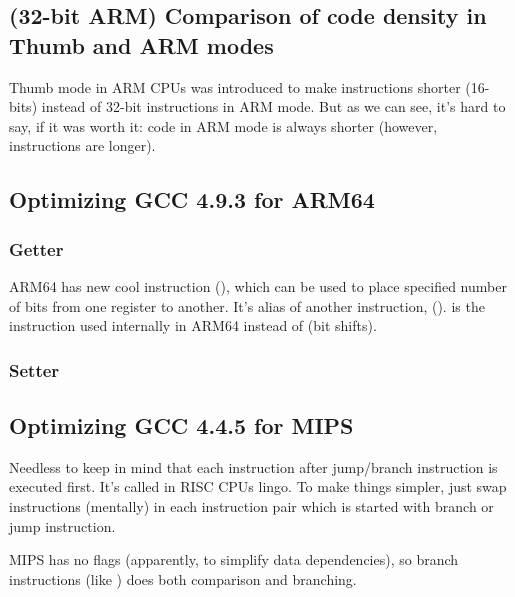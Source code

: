 \subsection{(32-bit ARM) Comparison of code density in Thumb and ARM modes}

Thumb mode in ARM CPUs was introduced to make instructions shorter (16-bits) instead of 32-bit instructions in ARM mode.
But as we can see, it's hard to say, if it was worth it: code in ARM mode is always shorter (however, instructions are longer).

\subsection{Optimizing GCC 4.9.3 for ARM64}

\subsubsection{Getter}



ARM64 has new cool instruction  (), 
which can be used to place specified number of bits from one register to another.
It's alias of another instruction,  ().
 is the instruction used internally in ARM64 instead of  (bit shifts).

\subsubsection{Setter}



\subsection{Optimizing GCC 4.4.5 for MIPS}

Needless to keep in mind that each instruction after jump/branch instruction is executed first.
It's called  in RISC CPUs lingo.
To make things simpler, just swap instructions (mentally) in each instruction pair which is started with branch or jump instruction.

MIPS has no flags (apparently, to simplify data dependencies), so branch instructions (like ) does both comparison and branching.

